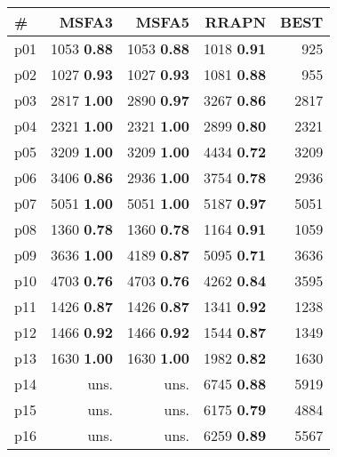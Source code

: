 \begin{tabular}{|l|rrr|r|}
\hline
\textbf{\#} & \textbf{MSFA3} & \textbf{MSFA5} & \textbf{RRAPN} & \textbf{BEST}\\
\hline
p01 & {\footnotesize 1053} \textbf{0.88} & {\footnotesize 1053} \textbf{0.88} & {\footnotesize 1018} \textbf{0.91} & 925\\
p02 & {\footnotesize 1027} \textbf{0.93} & {\footnotesize 1027} \textbf{0.93} & {\footnotesize 1081} \textbf{0.88} & 955\\
p03 & {\footnotesize 2817} \textbf{1.00} & {\footnotesize 2890} \textbf{0.97} & {\footnotesize 3267} \textbf{0.86} & 2817\\
p04 & {\footnotesize 2321} \textbf{1.00} & {\footnotesize 2321} \textbf{1.00} & {\footnotesize 2899} \textbf{0.80} & 2321\\
p05 & {\footnotesize 3209} \textbf{1.00} & {\footnotesize 3209} \textbf{1.00} & {\footnotesize 4434} \textbf{0.72} & 3209\\
p06 & {\footnotesize 3406} \textbf{0.86} & {\footnotesize 2936} \textbf{1.00} & {\footnotesize 3754} \textbf{0.78} & 2936\\
p07 & {\footnotesize 5051} \textbf{1.00} & {\footnotesize 5051} \textbf{1.00} & {\footnotesize 5187} \textbf{0.97} & 5051\\
p08 & {\footnotesize 1360} \textbf{0.78} & {\footnotesize 1360} \textbf{0.78} & {\footnotesize 1164} \textbf{0.91} & 1059\\
p09 & {\footnotesize 3636} \textbf{1.00} & {\footnotesize 4189} \textbf{0.87} & {\footnotesize 5095} \textbf{0.71} & 3636\\
p10 & {\footnotesize 4703} \textbf{0.76} & {\footnotesize 4703} \textbf{0.76} & {\footnotesize 4262} \textbf{0.84} & 3595\\
p11 & {\footnotesize 1426} \textbf{0.87} & {\footnotesize 1426} \textbf{0.87} & {\footnotesize 1341} \textbf{0.92} & 1238\\
p12 & {\footnotesize 1466} \textbf{0.92} & {\footnotesize 1466} \textbf{0.92} & {\footnotesize 1544} \textbf{0.87} & 1349\\
p13 & {\footnotesize 1630} \textbf{1.00} & {\footnotesize 1630} \textbf{1.00} & {\footnotesize 1982} \textbf{0.82} & 1630\\
p14 & uns. & uns. & {\footnotesize 6745} \textbf{0.88} & 5919\\
p15 & uns. & uns. & {\footnotesize 6175} \textbf{0.79} & 4884\\
p16 & uns. & uns. & {\footnotesize 6259} \textbf{0.89} & 5567\\

\end{tabular}
